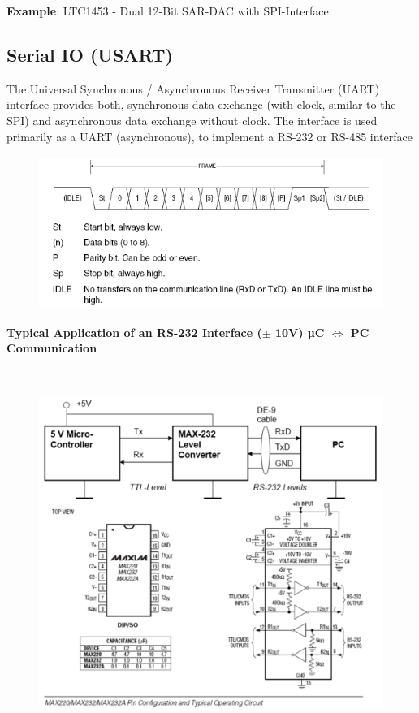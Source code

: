 \textbf{Example}: LTC1453 - Dual 12-Bit SAR-DAC with SPI-Interface.

\subsection{ Serial IO (USART)}

The Universal Synchronous / Asynchronous Receiver Transmitter (UART) interface provides both, synchronous data exchange (with clock, similar to the SPI) and asynchronous data exchange without clock. The interface is used primarily as a UART (asynchronous), to implement a RS-232 or RS-485 interface

    \begin{figure}[h]
    \centering
    \includegraphics[width=13cm, height=5cm]{Images/image45.png}
    \label{fig:Fig }
    \end{figure}
\newpage
 
\textbf{Typical Application of an RS-232 Interface ($\pm$ 10V) µC $\iff$ PC Communication}

    \begin{figure}[h]
    \centering
    \includegraphics[width=14cm, height=12cm]{Images/image46.png}
    \label{fig:Fig }
    \end{figure}

